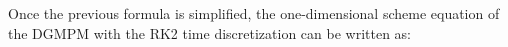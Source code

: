 Once the previous formula is simplified, the one-dimensional scheme equation of the DGMPM with the RK2 time discretization can be written as:
